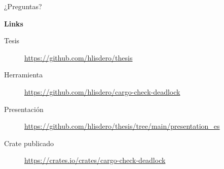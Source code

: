\documentclass{beamer}
\begin{document}
\begin{frame}{}
  \huge
  \centering
  ¿Preguntas?


  \vfill
  \raggedright
  \normalsize
  \textbf{Links}

  \scriptsize

  \begin{description}
    \item [Tesis] \url{https://github.com/hlisdero/thesis}
    \item [Herramienta] \url{https://github.com/hlisdero/cargo-check-deadlock}
    \item [Presentación] \url{https://github.com/hlisdero/thesis/tree/main/presentation_es}
    \item [Crate publicado] \url{https://crates.io/crates/cargo-check-deadlock}
  \end{description}
\end{frame}
\end{document}
